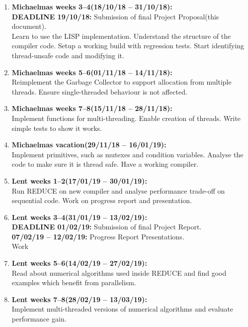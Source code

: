 \documentclass[12pt,a4paper,twoside]{article}
\begin{document}
\begin{enumerate}

\item \textbf{Michaelmas weeks 3--4(18/10/18 -- 31/10/18):} \\ 
\textbf{DEADLINE 19/10/18:} Submission of final Project Proposal(this document). \\
Learn to use the LISP implementation. Understand the structure of the compiler code.
Setup a working build with regression tests. Start identifying thread-unsafe code and
modifying it.

\item \textbf{Michaelmas weeks 5--6(01/11/18 -- 14/11/18):} \\
Reimplement the Garbage Collector to support allocation from multiple threads.
Ensure single-threaded behaviour is not affected.

\item \textbf{Michaelmas weeks 7--8(15/11/18 -- 28/11/18):} \\
Implement functions for multi-threading. Enable creation of threads. Write simple
tests to show it works.

\item \textbf{Michaelmas vacation(29/11/18 -- 16/01/19):} \\
Implement primitives, such as mutexes and condition variables. Analyse the code to
make sure it is thread safe. Have a working compiler.

\item \textbf{Lent weeks 1--2(17/01/19 -- 30/01/19):} \\
Run REDUCE on new compiler and analyse performance trade-off on sequential code.
Work on progress report and presentation.

\item \textbf{Lent weeks 3--4(31/01/19 -- 13/02/19):} \\
\textbf{DEADLINE 01/02/19:} Submission of final Project Report. \\
\textbf{07/02/19 -- 12/02/19:} Progress Report Presentations. \\
Work 

\item \textbf{Lent weeks 5--6(14/02/19 -- 27/02/19):} \\
Read about numerical algorithms used inside REDUCE and find
good examples which benefit from parallelism.

\item \textbf{Lent weeks 7--8(28/02/19 -- 13/03/19):} \\
Implement multi-threaded versions of numerical algorithms and
evaluate performance gain.


\end{enumerate}
\end{document}
